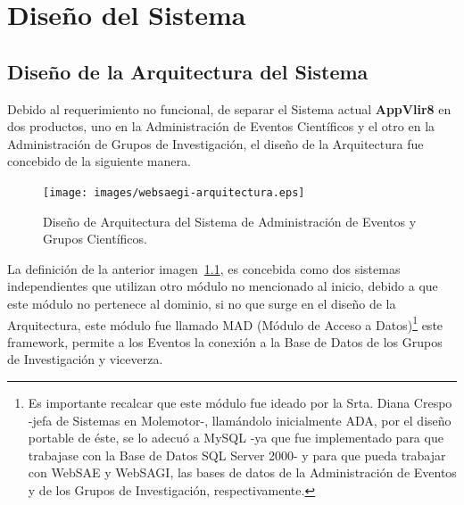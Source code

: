 \chapter{Dise\~no del Sistema}
\begin{indentar}
\end{indentar}

\section{Dise\~no de la Arquitectura del Sistema}
\begin{indentar}
Debido al requerimiento no funcional, de separar el Sistema actual \textbf{AppVlir8} en dos productos, uno en la Administraci\'on de Eventos Cient\'ificos y el otro en la Administraci\'on de Grupos de Investigaci\'on, el dise\~no de la Arquitectura fue concebido de la siguiente manera.

\begin{figure}
  \centering
    {\texttt{[image: images/websaegi-arquitectura.eps]}}
  \caption{Dise\~no de Arquitectura del Sistema de Administraci\'on de Eventos y Grupos Cient\'ificos.}
  \label{websaegi:arquitectura}
\end{figure}

La definici\'on de la anterior imagen~\ref{websaegi:arquitectura}, es concebida como dos sistemas independientes que utilizan otro m\'odulo no mencionado al inicio, debido a que este m\'odulo no pertenece al dominio, si no que surge en el dise\~no de la Arquitectura, este m\'odulo fue llamado MAD (M\'odulo de Acceso a Datos)\footnote{Es importante recalcar que este m\'odulo fue ideado por la Srta. Diana Crespo -jefa de Sistemas en Molemotor-, llam\'andolo inicialmente ADA, por el dise\~no portable de \'este, se lo adecu\'o a MySQL -ya que fue implementado para que trabajase con la Base de Datos SQL Server 2000- y para que pueda trabajar con WebSAE y WebSAGI, las bases de datos de la Administraci\'on de Eventos y de los Grupos de Investigaci\'on, respectivamente.} este framework, permite a los Eventos la conexi\'on a la Base de Datos de los Grupos de Investigaci\'on y viceverza.
\end{indentar}

